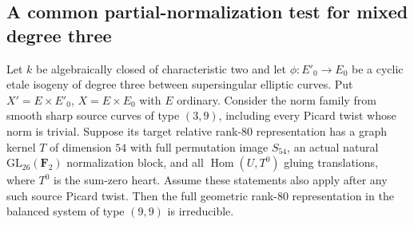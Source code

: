 \subsection{A common partial-normalization test for mixed degree three}
\begin{lemma}
\label{lem:root-mixed-d3-partial-normalization-candidate}
Let $k$ be algebraically closed of characteristic two and let
$\phi:E'_0\to E_0$ be a cyclic etale isogeny of degree three
between supersingular elliptic curves. Put $X'=E\times E'_0$,
$X=E\times E_0$ with $E$ ordinary. Consider the norm family
from smooth sharp source curves of type $(3,9)$, including every
Picard twist whose norm is trivial. Suppose its target relative
rank-$80$ representation has a graph kernel $T$ of dimension $54$
with full permutation image $S_{54}$, an actual natural
$\mathrm{GL}_{26}(\mathbf F_2)$ normalization block, and all
$\operatorname{Hom}(U,T^0)$ gluing translations, where $T^0$
is the sum-zero heart. Assume these statements also apply after
any such source Picard twist. Then the full geometric rank-$80$
representation in the balanced system of type $(9,9)$ is irreducible.
\end{lemma}
